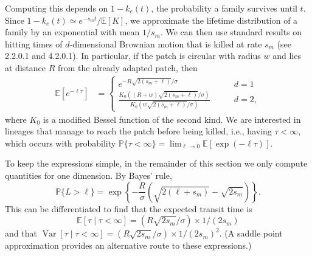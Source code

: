 \documentclass[10pt,letterpaper]{article}
\newcommand{\citet}[1]{\cite{#1}}
\DeclareMathOperator{\var}{Var}
\renewcommand{\P}{\mathbb{P}}
\newcommand{\E}{\mathbb{E}}
\newcommand{\given}{\mid}
\begin{document}
Computing this depends on $1-k_e(t)$, 
the probability a family survives until $t$.
Since $1-k_e(t) \simeq e^{-s_m t} / \E[K]$,
we approximate the lifetime distribution of a family by an exponential with mean $1/s_m$.
We can then use standard results on hitting times of $d$-dimensional Brownian motion
that is killed at rate $s_m$ (see \citet{borodin2002handbook} 2.2.0.1 and 4.2.0.1).
In particular, if the patch is circular with radius $w$ and lies at distance
$R$ from the already adapted patch, then 
\begin{align}
  \E[e^{-\ell \tau}] &=
    \begin{cases}
      e^{- R \sqrt{2(s_m+\ell)}/\sigma} \qquad & d=1 \\
      \frac{ K_0( (R+w)\sqrt{2(s_m+\ell)}/\sigma) }{ K_0( w\sqrt{2(s_m+\ell)}/\sigma) } \qquad & d=2  ,
    \end{cases} \label{eqn:borodinresult}
\end{align}
where $K_0$ is a modified Bessel function of the second kind.
We are interested in lineages that manage to reach the patch before being killed,
i.e., having $\tau < \infty$,
which occurs with probability
$\P\{\tau < \infty\} = \lim_{\ell \to 0} \E \left[\exp(-\ell \tau) \right]$. 

To keep the expressions simple, in the remainder of this section we only compute quantities for one dimension.
By Bayes' rule, 
\begin{equation} \label{eqn:haplen_cdf}
    \P\{ L > \ell \}
    = 
    \exp\left\{{-\frac{R}{\sigma}\left(\sqrt{2(\ell+s_m)} - \sqrt{2s_m}\right)}\right\} .
\end{equation}
This can be differentiated to find that the expected transit time is
\begin{equation} 
  \E[\tau \given \tau<\infty ] = (R\sqrt{2s_m}/\sigma)\times 1/(2s_m) \label{eqn:mean_tau}
\end{equation}
and that $\var[\tau \given \tau<\infty ] = (R\sqrt{2s_m}/\sigma) \times 1/(2s_m)^2$.
(A saddle point approximation provides an alternative route to these expressions.) 

\end{document}
